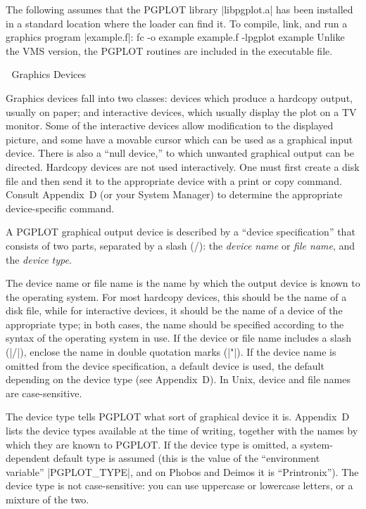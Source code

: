  The following assumes that the PGPLOT 
library |libpgplot.a| has been installed in a standard location where 
the loader can find it. To compile, link, and run a graphics program
|example.f|: 
\begintt
fc -o example example.f -lpgplot
example
\endtt
Unlike the VMS version, the PGPLOT routines are included in the 
executable file.


\beginsection Graphics Devices

Graphics devices fall into two classes: devices which produce a hardcopy
output, usually on paper; and interactive devices, which usually display
the plot on a TV monitor. Some of the interactive devices allow
modification to the displayed picture, and some have a movable cursor
which can be used as a graphical input device. There is also a ``null
device,'' to which unwanted graphical output can be directed. 
Hardcopy devices are not used interactively.  One must first create a
disk file and then send it to the appropriate device with a print or
copy command. Consult Appendix~D (or your System Manager) to determine
the appropriate device-specific command. 

A PGPLOT graphical output device is described by a ``device
specification'' that consists of two parts, separated by a slash (/):
the {\it device name\/} or {\it file name}, and the {\it device type}.

 The 
device name or file name is the name by which the output device is
known to the operating system. For most hardcopy devices, this should be
the name of a disk file, while for interactive devices, it should be the
name of a device of the appropriate type; in both cases, the name should
be specified according to the syntax of the operating system in use. If
the device or file name includes a slash (|/|), enclose the name in
double quotation marks (|"|). If the device name is omitted from the
device specification, a default device is used, the default depending on
the device type (see Appendix~D). In Unix, device and file names are 
case-sensitive.

 The
device type tells PGPLOT what sort of graphical device it is.
Appendix~D lists the device types available at the time of writing,
together with the names by which they are known to PGPLOT. If the device
type is omitted, a system-dependent default type is assumed (this is the
value of the ``environment variable'' |PGPLOT_TYPE|, and on Phobos and
Deimos it is ``Printronix''). The device type is not case-sensitive: you 
can use uppercase or lowercase letters, or a mixture of the two.

